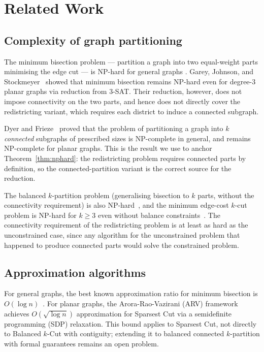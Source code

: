 \section{Related Work}
\label{sec:related}

\subsection{Complexity of graph partitioning}

The minimum bisection problem --- partition a graph into two equal-weight
parts minimising the edge cut --- is NP-hard for general graphs
\citep{garey1976simplified}.
Garey, Johnson, and Stockmeyer~\citep{garey1976simplified} showed that
minimum bisection remains NP-hard even for degree-3 planar graphs via
reduction from 3-SAT.
Their reduction, however, does not impose connectivity on the two parts,
and hence does not directly cover the redistricting variant, which
requires each district to induce a connected subgraph.

Dyer and Frieze~\citep{dyer1985partitioning} proved that the problem of
partitioning a graph into $k$ \emph{connected} subgraphs of prescribed
sizes is NP-complete in general, and remains NP-complete for planar
graphs.
This is the result we use to anchor Theorem~\ref{thm:nphard}: the
redistricting problem requires connected parts by definition, so the
connected-partition variant is the correct source for the reduction.

The balanced $k$-partition problem (generalising bisection to $k$ parts,
without the connectivity requirement) is also
NP-hard~\citep{andreev2006balanced}, and the minimum edge-cost $k$-cut
problem is NP-hard for $k \geq 3$ even without balance
constraints~\citep{goldschmidt1994polynomial}.
The connectivity requirement of the redistricting problem is at least as
hard as the unconstrained case, since any algorithm for the unconstrained
problem that happened to produce connected parts would solve the
constrained problem.

\subsection{Approximation algorithms}

For general graphs, the best known approximation ratio for minimum bisection
is $O(\log n)$~\citep{andreev2006balanced}.
For planar graphs, the Arora-Rao-Vazirani (ARV)
framework~\citep{arora2009expander} achieves $O(\sqrt{\log n})$
approximation for Sparsest Cut via a semidefinite programming (SDP)
relaxation.
This bound applies to Sparsest Cut, not directly to Balanced $k$-Cut
with contiguity; extending it to balanced connected $k$-partition
with formal guarantees remains an open problem.

